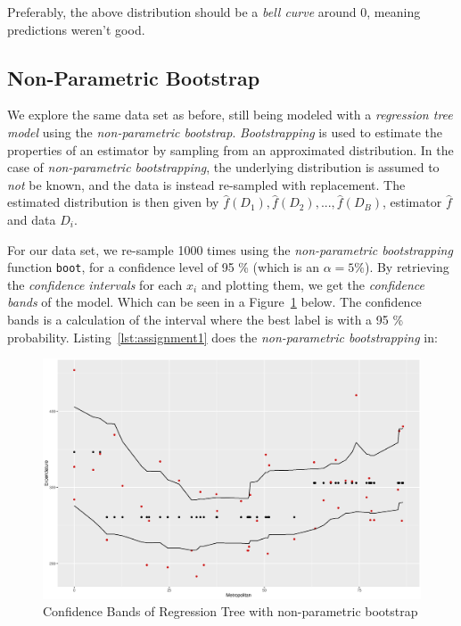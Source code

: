 \documentclass[a4paper,12pt]{article}
\begin{document}
        Preferably, the above distribution should be a \emph{bell curve} around 0, meaning predictions weren't good.

    \subsection*{Non-Parametric Bootstrap}

        We explore the same data set as before, still being modeled with a \emph{regression tree model} using the \emph{non-parametric bootstrap}. \emph{Bootstrapping} is used to estimate the properties of an estimator by sampling from an approximated distribution. In the case of \emph{non-parametric bootstrapping}, the underlying distribution is assumed to \emph{not} be known, and the data is instead re-sampled with replacement. The estimated distribution is then given by $\hat{f}(D_1), \hat{f}(D_2), ..., \hat{f}(D_B)$, estimator $\hat{f}$ and data $D_i$.

        For our data set, we re-sample 1000 times using the \emph{non-parametric bootstrapping} function \texttt{boot}, for a confidence level of 95 \% (which is an $\alpha = 5\%$). By retrieving the \emph{confidence intervals} for each $x_i$ and plotting them, we get the \emph{confidence bands} of the model. Which can be seen in a Figure~\ref{fig:confidence_bands} below. The confidence bands is a calculation of the interval where the best label is with a 95 \% probability.  Listing~\ref{lst:assignment1} does the \emph{non-parametric bootstrapping} in:
        

        \begin{figure}[H]
            \centering
            \caption{Confidence Bands of Regression Tree with non-parametric bootstrap}
            \label{fig:confidence_bands}
            \includegraphics[width=\textwidth]{share/A1_nonparametric.eps}
        \end{figure}
\end{document}
